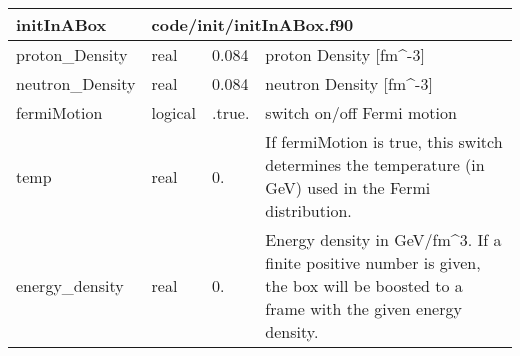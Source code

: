 \documentclass{article}
\begin{document}

\begin{longtable}{llll}
\toprule
\textbf{\large{initInABox}} & \multicolumn{3}{l}{\footnotesize{code/init/initInABox.f90}}\\*
\midrule
\endfirsthead
\midrule
\endhead
proton\_Density & \begin{minipage}[t]{2cm}real\end{minipage} & \begin{minipage}[t]{2cm}0.084\end{minipage} & \begin{minipage}[t]{12cm}proton Density [fm\^{}-3]\end{minipage}\\*
\midrule
neutron\_Density & \begin{minipage}[t]{2cm}real\end{minipage} & \begin{minipage}[t]{2cm}0.084\end{minipage} & \begin{minipage}[t]{12cm}neutron Density [fm\^{}-3]\end{minipage}\\*
\midrule
fermiMotion & \begin{minipage}[t]{2cm}logical\end{minipage} & \begin{minipage}[t]{2cm}.true.\end{minipage} & \begin{minipage}[t]{12cm}switch on/off Fermi motion\end{minipage}\\*
\midrule
temp & \begin{minipage}[t]{2cm}real\end{minipage} & \begin{minipage}[t]{2cm}0.\end{minipage} & \begin{minipage}[t]{12cm}If fermiMotion is true, this switch determines the temperature (in GeV) used in the Fermi distribution.\end{minipage}\\*
\midrule
energy\_density & \begin{minipage}[t]{2cm}real\end{minipage} & \begin{minipage}[t]{2cm}0.\end{minipage} & \begin{minipage}[t]{12cm}Energy density in GeV/fm\^{}3. If a finite positive number is given, the box will be boosted to a frame with the given energy density.\end{minipage}\\*

\end{longtable}
\end{document}
